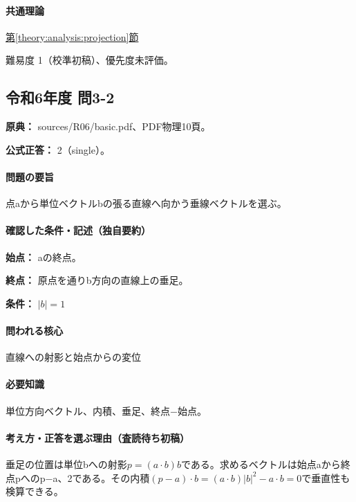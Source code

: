 \paragraph{共通理論} \hyperref[theory:analysis:projection]{第\ref*{theory:analysis:projection}節}

\par 難易度 1（校準初稿）、優先度未評価。

\subsection{令和6年度 問3-2}
\label{q:r06-reg-basic-3-2}

\noindent\textbf{原典：} sources/R06/basic.pdf、PDF物理10頁。

\textbf{公式正答：} 2（single）。

\paragraph{問題の要旨} 点aから単位ベクトルbの張る直線へ向かう垂線ベクトルを選ぶ。

\paragraph{確認した条件・記述（独自要約）}\mbox{}\par

\noindent\textbf{始点：} aの終点。\par

\noindent\textbf{終点：} 原点を通りb方向の直線上の垂足。\par

\noindent\textbf{条件：} \(|b|=1\)\par

\paragraph{問われる核心} 直線への射影と始点からの変位

\paragraph{必要知識} 単位方向ベクトル、内積、垂足、終点−始点。

\paragraph{考え方・正答を選ぶ理由（査読待ち初稿）} 垂足の位置は単位bへの射影\(p=(a\cdot b)b\)である。求めるベクトルは始点aから終点pへのp−a、2である。その内積\((p-a)\cdot b=(a\cdot b)|b|^2-a\cdot b=0\)で垂直性も検算できる。

